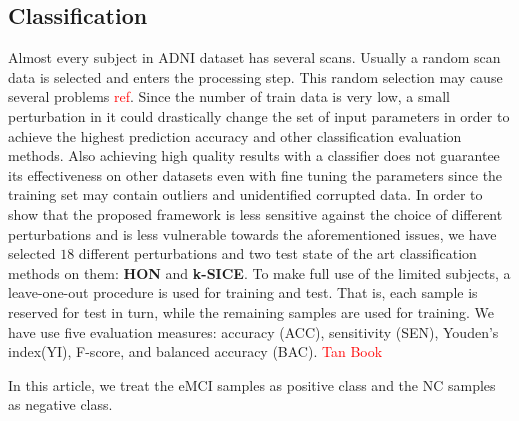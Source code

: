 \documentclass[preprint,12pt]{elsarticle}
\begin{document}
\subsection{Classification}

Almost every subject in ADNI dataset has several scans. Usually a random scan data is selected and enters the processing step. This random selection may cause several problems \textcolor{red}{ref}. Since the number of train data is very low, a small perturbation in it could drastically change the set of input parameters in order to achieve the highest prediction accuracy and other classification evaluation methods. Also achieving high quality results with a classifier does not guarantee its effectiveness on other datasets even with fine tuning the parameters since the training set may contain outliers and unidentified corrupted data. 
In order to show that the proposed framework is less sensitive against the choice of different perturbations and is less vulnerable towards the aforementioned issues, we have selected $18$ different perturbations and two test state of the art classification methods on them: \textbf{HON} and \textbf{k-SICE}.   
To make full use of the limited subjects, a leave-one-out procedure is used for training and test. That is, each sample is reserved for test in turn, while the remaining samples are used for training.
We have use five
evaluation measures: accuracy (ACC), sensitivity (SEN), Youden’s index(YI), F-score, and balanced accuracy (BAC).
\textcolor{red}{Tan Book} 

In this article, we treat the eMCI samples as positive class and the NC samples as negative class.
\end{document}
